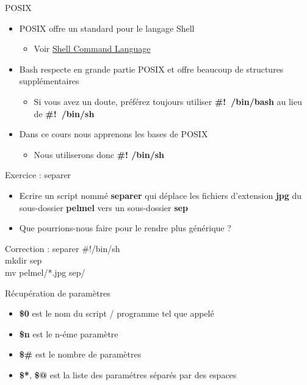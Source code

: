 \documentclass[xcolor=table]{beamer}
\begin{document}
\begin{frame}{POSIX}
\begin{itemize}
    \item POSIX offre un standard pour le langage Shell
    \begin{itemize}
        \item Voir \href{http://pubs.opengroup.org/onlinepubs/009695399/utilities/xcu_chap02.html}{Shell Command Language}
    \end{itemize}
    \item Bash respecte en grande partie POSIX et offre beaucoup de structures supplémentaires
    \begin{itemize}
        \item Si vous avez un doute, préférez toujours utiliser \textbf{\#!~/bin/bash} au lieu de \textbf{\#!~/bin/sh}
    \end{itemize}
    \item Dans ce cours nous apprenons les bases de POSIX
    \begin{itemize}
        \item Nous utiliserons donc \textbf{\#! /bin/sh}
    \end{itemize}
\end{itemize}
\end{frame}

\begin{frame}{Exercice : separer}
\begin{itemize}
    \item Ecrire un script nommé \textbf{separer} qui déplace les fichiers d'extension \textbf{jpg} du sous-dossier \textbf{pelmel} vers un sous-dossier \textbf{sep}
    \item Que pourrions-nous faire pour le rendre plus générique ?
\end{itemize}
\end{frame}

\begin{frame}{Correction : separer}
\#!/bin/sh\\
mkdir sep\\
mv pelmel/*.jpg sep/
\end{frame}

\begin{frame}{Récupération de paramètres}
\begin{itemize}
    \item \textbf{\$0} est le nom du script / programme tel que appelé
    \item \textbf{\$n} est le n-éme paramètre
    \item \textbf{\$\#} est le nombre de paramètres
    \item \textbf{\$*}, \textbf{\$@} est la liste des paramétres séparés par des espaces
\end{itemize}
\end{frame}
\end{document}
